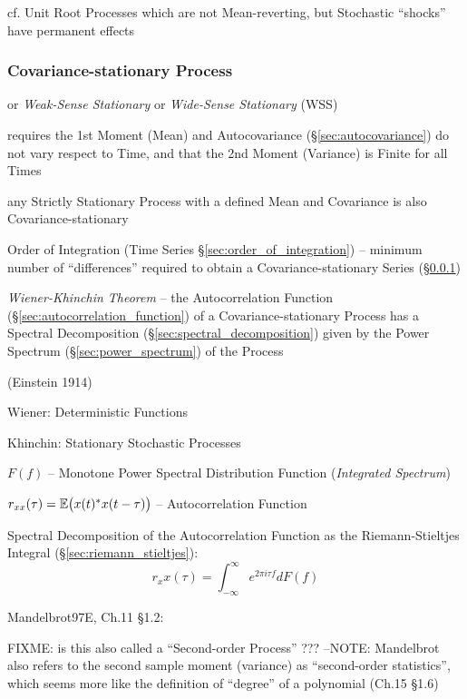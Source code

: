 cf. Unit Root Processes which are not Mean-reverting, but Stochastic ``shocks''
have permanent effects



\subsubsection{Covariance-stationary Process}\label{sec:covariance_stationary}

or \emph{Weak-Sense Stationary} or \emph{Wide-Sense Stationary} (WSS)

requires the 1st Moment (Mean) and Autocovariance (\S\ref{sec:autocovariance})
do not vary respect to Time, and that the 2nd Moment (Variance) is Finite for
all Times

any Strictly Stationary Process with a defined Mean and Covariance is also
Covariance-stationary

\fist Order of Integration (Time Series \S\ref{sec:order_of_integration}) --
minimum number of ``differences'' required to obtain a Covariance-stationary
Series (\S\ref{sec:covariance_stationary})

\emph{Wiener-Khinchin Theorem} -- the Autocorrelation Function
(\S\ref{sec:autocorrelation_function}) of a Covariance-stationary Process has a
Spectral Decomposition (\S\ref{sec:spectral_decomposition}) given by the Power
Spectrum (\S\ref{sec:power_spectrum}) of the Process

(Einstein 1914)

Wiener: Deterministic Functions

Khinchin: Stationary Stochastic Processes

$F(f)$ -- Monotone Power Spectral Distribution Function
(\emph{Integrated Spectrum})

$r_{xx}(\tau) = \mathbb{E}\big(x(t)^* x(t - \tau)\big)$ -- Autocorrelation Function

Spectral Decomposition of the Autocorrelation Function as the Riemann-Stieltjes
Integral (\S\ref{sec:riemann_stieltjes}):
\[
  r_xx(\tau) = \int_{-\infty}^\infty e^{2\pi i\tau f} dF(f)
\]

Mandelbrot97E, Ch.11 \S 1.2:

FIXME: is this also called a ``Second-order Process'' ???
--NOTE: Mandelbrot also refers to the second sample moment (variance) as
``second-order statistics'', which seems more like the definition of ``degree''
of a polynomial (Ch.15 \S 1.6)

